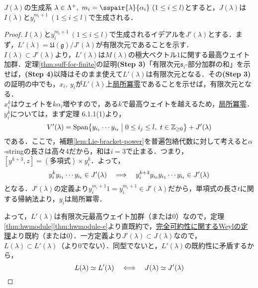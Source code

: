 \documentclass[rep_main]{subfiles}
\begin{document}
\begin{mytheo}[label=thm:generator-of-J]{$J(\lambda)$の生成系}
	$\lambda \in \Lambda^+,\ m_i = \sspair{\lambda}{\alpha_i}\ (1 \leq i \leq l)$とすると，$J(\lambda)$は$I(\lambda)$と$y_i^{m_i + 1}\  (1 \leq i \leq l)$で生成される．
\end{mytheo}
\begin{proof}
	$I(\lambda)$と$y_i^{m_i + 1}\  (1 \leq i \leq l)$で生成されるイデアルを$J'(\lambda)$とする．まず，$L'(\lambda) = \mathfrak{U}(\mathfrak{g}) / J'(\lambda)$が有限次元であることを示す．\\
	$I(\lambda) \subset J'(\lambda)$より，$L'(\lambda)$は$M(\lambda)$の極大ベクトル$1$に関する最高ウェイト加群．定理\ref{thm:suff-for-finite}の証明\textbf{(Step 3)}「有限次元$\mathfrak{s}_i$-部分加群の和」を示せば，\textbf{(Step 4)}以降はそのまま使えて$L'(\lambda)$は有限次元となる．その\textbf{(Step 3)}の証明の中でも，$x_i,\ y_i$が$L'(\lambda)$上\hyperref[def:locally-nilpotent]{局所冪零}であることを示せば，有限次元となる．\\
	$x_i^k$はウェイトを$k\alpha_i$増やすので，ある$k$で最高ウェイトを越えるため，\hyperref[def:locally-nilpotent]{局所冪零}．$y_i^k$については，まず定理 6.1.1(1)より，
	\begin{equation}
		V'(\lambda) = \operatorname{Span}\bigl\{y_{i_1}\cdots y_{i_t} \bigm| 0 \leq i_j \leq l,\ t \in \mathbb{Z}_{\geq 0} \bigr\} + J'(\lambda) 
	\end{equation}
	である．ここで，補題\ref{lem:Lie-bracket-power}を普遍包絡代数に対して考えると$\alpha$-stringの長さは高々4だから，和は$i=3$で止まる．つまり，$[y^{k+3}, z] = (\text{多項式})\times y_i^k$．よって，
	\begin{equation}
		y_i^ky_{i_1}\cdots y_{i_t} \in J'(\lambda) \quad \Longrightarrow \quad  y_i^{k+3}y_{i_0}y_{i_1}\cdots y_{i_t} \in J'(\lambda)
	\end{equation}
	となる．$J'(\lambda)$の定義より$y_i^{m_i + 1}1 = y_i^{m_i + 1} \in J'(\lambda)$だから，単項式の長さ$t$に関する帰納法より，$y_i$は局所冪零．
	
	よって，$L'(\lambda)$は有限次元最高ウェイト加群（または$0$）なので，定理\ref{thm:hwmodule}\ref{thm:hwmodule-e}より直既約で，\hyperref[thm:Weyl]{完全可約性に関するWeylの定理}より既約（または$0$）．一方定義より$J'(\lambda) \subset J(\lambda)$なので，$L(\lambda) \subset L'(\lambda)$（より$0$でない）．同型でないと，$L'(\lambda)$の既約性に矛盾するから，
	\begin{equation}
		L(\lambda) \simeq L'(\lambda)  \quad \Longleftrightarrow \quad  J(\lambda) \simeq J'(\lambda)
	\end{equation}
\end{proof}
\end{document}
